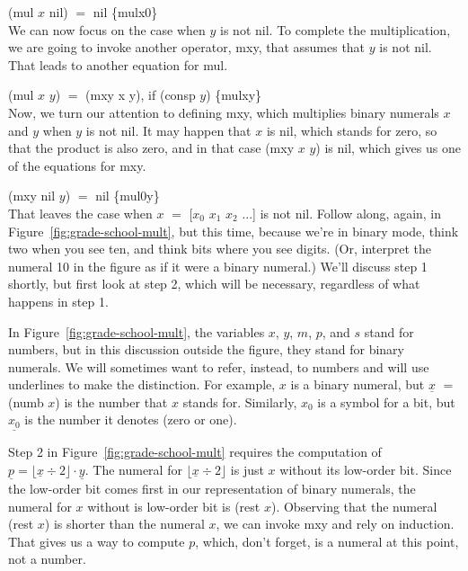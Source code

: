 \hspace*{2cm} \textsf{(mul $x$ nil)} $=$ \textsf{nil} \hspace{2cm} \hfill \{mulx0\}
\\

We can now focus on the case when $y$ is not \textsf{nil}.
To complete the multiplication,
we are going to invoke another operator, \textsf{mxy},
that assumes that $y$ is not \textsf{nil}.
That leads to another equation for \textsf{mul}.

\hspace*{2cm} \textsf{(mul $x$ $y$)} $=$ \textsf{(mxy x y)}, if \textsf{(consp $y$)} \hfill \{mulxy\}
\\

Now, we turn our attention to defining \textsf{mxy}, which multiplies binary
numerals $x$ and $y$ when $y$ is not \textsf{nil}.
It may happen that $x$ is \textsf{nil}, which stands for zero, so that
the product is also zero, and in that case \textsf{(mxy $x$ $y$)} is \textsf{nil},
which gives us one of the equations for \textsf{mxy}.

\hspace*{2cm} \textsf{(mxy nil $y$)} $=$ \textsf{nil}  \hfill \{mul0y\}
\\

That leaves the case when $x$ $=$ \textsf{[$x_0$ $x_1$ $x_2$ ...]} is not \textsf{nil}.
Follow along, again, in Figure~\ref{fig:grade-school-mult},
but this time, because we're in binary mode, think two when you see ten,
and think bits where you see digits. (Or, interpret the numeral 10
in the figure as if it were a binary numeral.)
We'll discuss step 1 shortly, but first look at step 2,
which will be necessary, regardless of what happens in step 1.

In Figure~\ref{fig:grade-school-mult}, the variables $x$, $y$, $m$, $p$, and $s$
stand for numbers, but in this discussion outside the figure,
they stand for binary numerals.
We will sometimes want to refer, instead, to numbers
and will use underlines to make the distinction.
For example, $x$ is a binary numeral,
but $\underline{x}$ $=$ \textsf{(numb $x$)}
is the number that $x$ stands for.
Similarly, $x_0$ is a symbol for a bit,
but $\underline{x_0}$ is the number it denotes (zero or one).

Step 2 in Figure~\ref{fig:grade-school-mult} requires the computation of
$\underline{p} = \lfloor \underline{x} \div 2 \rfloor \cdot \underline{y}$.
The numeral for $\lfloor \underline{x} \div 2 \rfloor$ is just $x$ without its
low-order bit. Since the low-order bit comes first
in our representation of binary numerals,
the numeral for $x$ without is low-order bit is \textsf{(rest $x$)}.
Observing that the numeral \textsf{(rest $x$)}
is shorter than the numeral $x$,
we can invoke \textsf{mxy} and rely on induction.
That gives us a way to compute $p$, which, don't forget,
is a numeral at this point, not a number.

